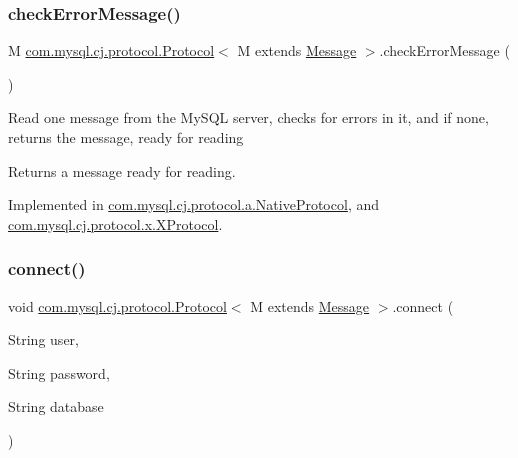 \mbox{\label{interfacecom_1_1mysql_1_1cj_1_1protocol_1_1_protocol_a7176330712bc7aa3ba67261d4a8ef0ca}} 
\subsubsection{\texorpdfstring{check\+Error\+Message()}{checkErrorMessage()}}
{\footnotesize\ttfamily M \mbox{\hyperlink{interfacecom_1_1mysql_1_1cj_1_1protocol_1_1_protocol}{com.\+mysql.\+cj.\+protocol.\+Protocol}}$<$ M extends \mbox{\hyperlink{interfacecom_1_1mysql_1_1cj_1_1protocol_1_1_message}{Message}} $>$.check\+Error\+Message (\begin{DoxyParamCaption}{ }\end{DoxyParamCaption})}

Read one message from the My\+S\+QL server, checks for errors in it, and if none, returns the message, ready for reading

\begin{DoxyReturn}{Returns}
a message ready for reading. 
\end{DoxyReturn}


Implemented in \mbox{\hyperlink{classcom_1_1mysql_1_1cj_1_1protocol_1_1a_1_1_native_protocol_a7c2558549dd31879ef27e087724c3c44}{com.\+mysql.\+cj.\+protocol.\+a.\+Native\+Protocol}}, and \mbox{\hyperlink{classcom_1_1mysql_1_1cj_1_1protocol_1_1x_1_1_x_protocol_a3774ce524cf53d4c5412c0b4d5a3dbda}{com.\+mysql.\+cj.\+protocol.\+x.\+X\+Protocol}}.

\mbox{\label{interfacecom_1_1mysql_1_1cj_1_1protocol_1_1_protocol_a62fc4a0bb330ef36eb91217c33b36ab8}} 
\subsubsection{\texorpdfstring{connect()}{connect()}}
{\footnotesize\ttfamily void \mbox{\hyperlink{interfacecom_1_1mysql_1_1cj_1_1protocol_1_1_protocol}{com.\+mysql.\+cj.\+protocol.\+Protocol}}$<$ M extends \mbox{\hyperlink{interfacecom_1_1mysql_1_1cj_1_1protocol_1_1_message}{Message}} $>$.connect (\begin{DoxyParamCaption}\item[{String}]{user,  }\item[{String}]{password,  }\item[{String}]{database }\end{DoxyParamCaption})}

